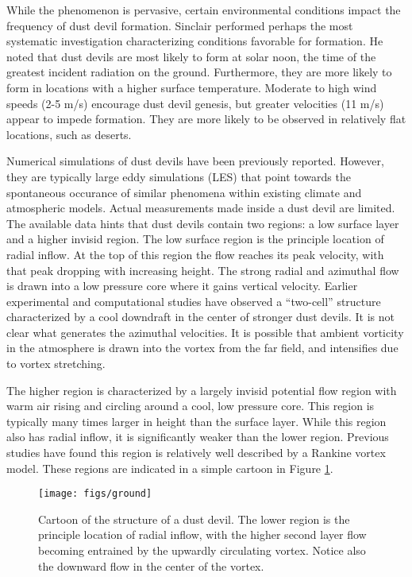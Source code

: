 While the phenomenon is pervasive, certain 
environmental conditions impact the frequency of dust devil formation.
Sinclair\cite{Sinclair1969} performed perhaps the most 
systematic investigation characterizing conditions favorable for
formation. He noted that dust devils are most
likely to form at solar noon, the time of the greatest incident radiation 
on the ground. Furthermore, they are more likely to form in locations 
with a higher surface temperature. Moderate to high wind speeds (2-5
m/s) encourage dust devil genesis, but greater velocities (11 m/s)
appear to impede formation. They are more likely to be observed in
relatively flat locations, such as deserts.  

Numerical simulations of dust devils have been previously
reported.
However, they are typically large eddy simulations (LES) that point
towards the spontaneous occurance of similar phenomena within existing
climate and atmospheric
models\cite{QJ:QJ200513160722,doi:10.3137/ao.420105}. Actual
measurements made inside a dust devil are limited. The available data
hints that dust devils contain two regions: a low surface layer and a
higher invisid region. The low surface region is the  principle location
of radial inflow. At the top of this region the flow 
reaches its peak velocity, with that peak dropping with increasing height. 
The strong radial and azimuthal flow is drawn into a low pressure core 
where it gains vertical velocity. Earlier experimental and 
computational studies have observed a ``two-cell'' structure
characterized by a cool downdraft in the center of stronger dust
devils\cite{doi:10.3137/ao.420105,Sinclair1973}. It is not clear what
generates the azimuthal velocities. It is possible that ambient
vorticity in the atmosphere is drawn into the vortex from the far field,
and intensifies due to vortex stretching.  

The higher region is characterized by a largely invisid potential flow
region with warm air rising and circling around a cool, low pressure
core. This region is typically many times larger in height than the
surface layer. While this region also has radial inflow, it is
significantly weaker than the lower region. Previous studies have found
this region is relatively well described by a Rankine vortex
model\cite{Sinclair1973}. These regions are indicated in a 
simple cartoon in Figure \ref{fig:cartoon}.

  \begin{figure}[!htb]
    \begin{center}
     \texttt{[image: figs/ground]}
     \caption{Cartoon of the structure of a dust devil. The lower region
     is the principle location of radial inflow, with the higher second
     layer flow becoming entrained by the upwardly circulating
     vortex. Notice also the downward flow in the center of the vortex.}
     \label{fig:cartoon}
    \end{center}
  \end{figure}



